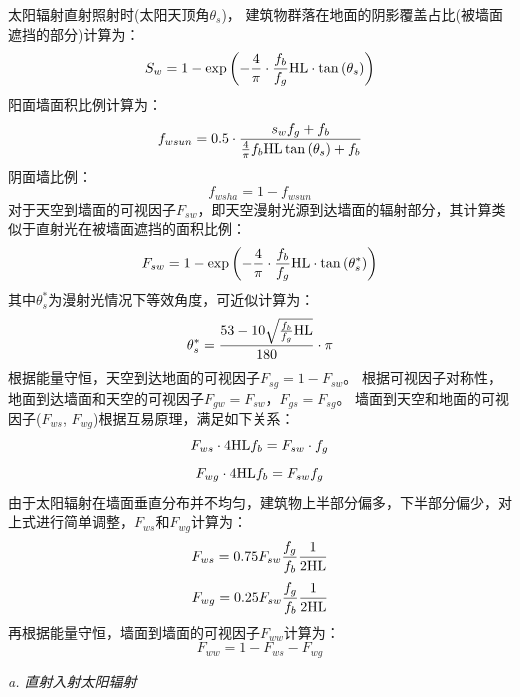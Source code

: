太阳辐射直射照射时(太阳天顶角$\theta_s$)，
建筑物群落在地面的阴影覆盖占比(被墙面遮挡的部分)计算为：
\begin{equation}\label{S_w}
S_{w}=1-\exp \left(-\frac{4}{\pi} \cdot \frac{f_{b}}{f_{g}} {\rm HL} \cdot \tan \left(\theta_{s}\right)\right)
\end{equation}
阳面墙面积比例计算为：
\begin{equation}\label{f_wsun}
f_{wsun}=0.5 \cdot \frac{s_{w} f_{g}+f_{b}}{\frac{4}{\pi} f_{b} {\rm HL} \tan \left(\theta_{s}\right)+f_{b}}
\end{equation}
阴面墙比例：
\begin{equation}\label{f_wsha}
f_{wsha}=1-f_{wsun}
\end{equation}
对于天空到墙面的可视因子$F_{sw}$，即天空漫射光源到达墙面的辐射部分，其计算类似于直射光在被墙面遮挡的面积比例：
\begin{equation}\label{f_sw}
F_{sw}=1-\exp \left(-\frac{4}{\pi} \cdot \frac{f_{b}}{f_{g}} {\rm HL} \cdot \tan \left(\theta_{s}^{*}\right)\right)
\end{equation}
其中$\theta_s^\ast$为漫射光情况下等效角度，可近似计算为：
\begin{equation}
\theta_{s}^{*}=\frac{53-10 \sqrt{\frac{f_{b}}{f_{g}} {\rm HL}}}{180} \cdot \pi
\end{equation}
根据能量守恒，天空到达地面的可视因子$F_{sg}=1-F_{sw}$。
根据可视因子对称性，地面到达墙面和天空的可视因子$F_{gw}=F_{sw}$，$F_{gs}=F_{sg}$。
墙面到天空和地面的可视因子($F_{ws}$, $F_{wg}$)根据互易原理，满足如下关系：
\begin{equation}
F_{ws} \cdot 4 {\rm HL} f_{b}=F_{s w} \cdot f_{g}
\end{equation}
\begin{equation}
F_{wg} \cdot 4 {\rm HL} f_{b}=F_{s w} f_{g}
\end{equation}
由于太阳辐射在墙面垂直分布并不均匀，建筑物上半部分偏多，下半部分偏少，对上式进行简单调整，$F_{ws}$和$F_{wg}$计算为：
\begin{equation}
F_{ws}=0.75 F_{s w} \frac{f_{g}}{f_{b}} \frac{1}{2 {\rm HL}}
\end{equation}
\begin{equation}
F_{wg}=0.25 F_{s w} \frac{f_{g}}{f_{b}} \frac{1}{2 {\rm HL}}
\end{equation}
再根据能量守恒，墙面到墙面的可视因子$F_{ww}$计算为：
\begin{equation}
F_{ww}=1-F_{ws}-F_{wg}
\end{equation}

\textit{a. 直射入射太阳辐射}

